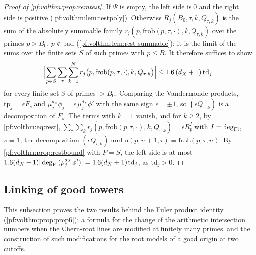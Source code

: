 \begin{proof}[Proof of \cref{pf:volthm:prop:remtest}]
If $\Psi$ is empty, the left side is $0$ and the right side is positive (\cref{pf:volthm:lem:testpoly}). Otherwise
$R_j(B_0,\tau,k,Q_{\tau,k})$ is the sum of the absolutely summable family $r_j(p,\mathrm{frob}(p,\tau,\cdot),k,Q_{\tau,k})$
over the primes $p>B_0$, $p\notin\mathrm{bad}$ (\cref{pf:volthm:lem:rest-summable}); it is the limit of the sums over
the finite sets $S$ of such primes with $p\le B$. It therefore suffices to show
\[
\Bigl|\sum_{p\in S}\sum_\tau\sum_{k=1}^Nr_j\bigl(p,\mathrm{frob}(p,\tau,\cdot),k,Q_{\tau,k}\bigr)\Bigr|\le1.6\,(d_X+1)\,\mathrm{td}_j
\]
for every finite set $S$ of primes $>B_0$. Comparing the Vandermonde products, $\mathrm{tp}_j=\epsilon F_s$ and
$\mu_j^{d_X}\phi_j=\epsilon\,\mu_j^{d_X}\phi'$ with the same sign $\epsilon=\pm1$, so $(\epsilon Q_{\tau,k})$ is a
decomposition of $F_s$. The terms with $k=1$ vanish, and for $k\ge2$, by \eqref{pf:volthm:eq:rest},
$\sum_\tau\sum_kr_j(p,\mathrm{frob}(p,\tau,\cdot),k,Q_{\tau,k})=\epsilon R^I_p$ with $I=\deg_{\mathrm{Fl}}$, $v=1$, the
decomposition $(\epsilon Q_{\tau,k})$ and $\sigma(p,n+1,\tau)=\mathrm{frob}(p,\tau,n)$. By
\cref{pf:volthm:prop:restbound} with $P=S$,
the left side is at most $1.6(d_X+1)|\deg_{\mathrm{Fl}}(\mu_j^{d_X}\phi')|=1.6(d_X+1)\,\mathrm{td}_j$, as $\mathrm{td}_j>0$.
\end{proof}

\subsection{Linking of good towers}\label{pf:volthm:sec:linking}

This subsection proves the two results behind the Euler product identity (\cref{pf:volthm:prop:prop6}): a
formula for the change of the arithmetic intersection numbers when the Chern-root lines are modified at finitely many
primes, and the construction of such modifications for the root models of a good origin at two cutoffs.

